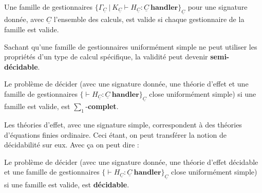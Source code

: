 \begin{definition}
	Une famille de gestionnaires $\{\Gamma_{\underline{C}}~|~K_{\underline{C}} \vdash H_{\underline{C}}:\underline{C}~\textbf{handler}\}_{\underline{C}}$  pour une signature donnée, avec $\underline{C}$ l'ensemble des calculs, est valide si chaque gestionnaire de la famille est valide.
\end{definition}

Sachant qu'une famille de gestionnaires uniformément simple ne peut utiliser les propriétés d'un type de calcul spécifique, la validité peut devenir \textbf{semi-décidable}.

\begin{theorem}
	Le problème de décider (avec une signature donnée, une théorie d'effet et une famille de gestionnaires $\{\vdash H_{\underline{C}}:\underline{C}~\textbf{handler}\}_{\underline{C}}$ close uniformément simple) si une famille est valide, est $\sum_1$-\textbf{complet}.
\end{theorem}

Les théories d'effet, avec une signature simple, correspondent à des théories d'équations finies ordinaire. Ceci étant, on peut transférer la notion de décidabilité sur eux. Avec ça on peut dire :

\begin{theorem}
	Le problème de décider (avec une signature donnée, une théorie d'effet décidable et une famille de gestionnaires $\{\vdash H_{\underline{C}}:\underline{C}~\textbf{handler}\}_{\underline{C}}$ close uniformément simple) si une famille est valide, est \textbf{décidable}.
\end{theorem}